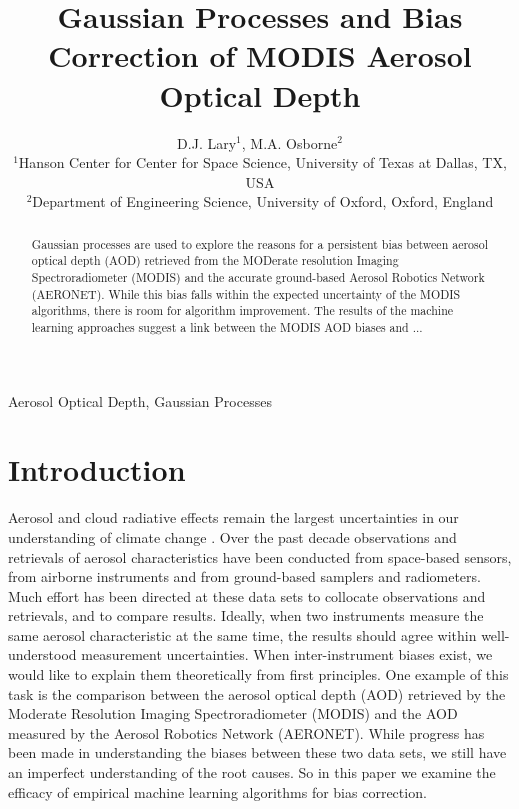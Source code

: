 \documentclass[journal]{IEEEtran}
\begin{document}
\title{Gaussian Processes and Bias Correction of MODIS Aerosol Optical Depth}
\author{D.J. Lary$^{1}$, M.A. Osborne$^2$\\
$^1$Hanson Center for Center for Space Science, University of Texas at Dallas, TX, USA\\
$^2$Department of Engineering Science, University of Oxford, Oxford, England
}
\maketitle

\begin{abstract}

Gaussian processes are used to explore the reasons for a persistent bias between aerosol optical depth (AOD) retrieved from the MODerate resolution Imaging Spectroradiometer (MODIS) and the accurate ground-based Aerosol Robotics Network (AERONET). While this bias falls within the expected uncertainty of the MODIS algorithms, there is room for algorithm improvement.  The results of the machine learning approaches suggest a link between the MODIS AOD biases and ...
\end{abstract}

\begin{keywords}
Aerosol Optical Depth, Gaussian Processes
\end{keywords}
\IEEEpeerreviewmaketitle

\section{Introduction}

Aerosol and cloud radiative effects remain the largest uncertainties in our understanding of climate change \cite{IPCC:2007}. Over the past decade observations and retrievals of aerosol characteristics have been conducted from space-based sensors, from airborne instruments and from ground-based samplers and radiometers.  Much effort has been directed at these data sets to collocate observations and retrievals, and to compare results.  Ideally, when two instruments measure the same aerosol characteristic at the same time, the results should agree within well-understood measurement uncertainties.  When inter-instrument biases exist,  we would like to explain them theoretically from first principles. One example of this task is the comparison between the aerosol optical depth (AOD) retrieved by the Moderate Resolution Imaging Spectroradiometer (MODIS) and the AOD measured by the Aerosol Robotics Network (AERONET). While progress has been made in understanding the biases between these two data sets, we still have an imperfect understanding of the root causes. So in this paper we examine the efficacy of empirical machine learning algorithms for bias correction.
\end{document}
